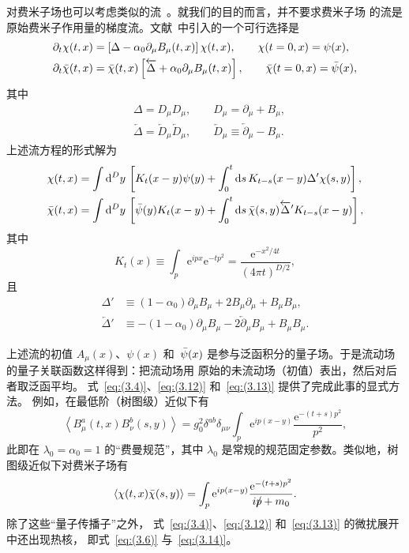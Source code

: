 对费米子场也可以考虑类似的流~\cite{Luscher:2013cpa}。就我们的目的而言，并不要求费米子场
的流是原始费米子作用量的梯度流。文献~\cite{Luscher:2013cpa}中引入的一个可行选择是
\begin{align}
   &\partial_t\chi(t,x)=\left[\Delta-\alpha_0\partial_\mu B_\mu(t,x)\right]
   \chi(t,x),\qquad
   \chi(t=0,x)=\psi(x),
\label{eq:(3.8)}\\
   &\partial_t\Bar{\chi}(t,x)
   =\Bar{\chi}(t,x)
   \left[\overleftarrow{\Delta}
   +\alpha_0\partial_\mu B_\mu(t,x)\right],
   \qquad\Bar{\chi}(t=0,x)=\Bar{\psi}(x),
\label{eq:(3.9)}
\end{align}
其中
\begin{align}
   &\Delta=D_\mu D_\mu,\qquad D_\mu=\partial_\mu+B_\mu,
\label{eq:(3.10)}\\
   &\overleftarrow{\Delta}=\overleftarrow{D}_\mu\overleftarrow{D}_\mu,
   \qquad\overleftarrow{D}_\mu\equiv\overleftarrow{\partial}_\mu-B_\mu.
\label{eq:(3.11)}
\end{align}
上述流方程的形式解为
\begin{align}
   \chi(t,x)&=\int\mathrm{d}^Dy\,
   \left[
   K_t(x-y)\psi(y)
   +\int_0^t\mathrm{d}s\,K_{t-s}(x-y)\Delta'\chi(s,y)
   \right],
\label{eq:(3.12)}\\
   \Bar{\chi}(t,x)&=\int\mathrm{d}^Dy\,
   \left[
   \Bar{\psi}(y)K_t(x-y)
   +\int_0^t\mathrm{d}s\,\Bar{\chi}(s,y)\overleftarrow{\Delta}'K_{t-s}(x-y)
   \right],
\label{eq:(3.13)}
\end{align}
其中
\begin{equation}
   K_t(x)\equiv\int_p \mathrm{e}^{ipx}\mathrm{e}^{-tp^2}=\frac{\mathrm{e}^{-x^2/4t}}{(4\pi t)^{D/2}},
\label{eq:(3.14)}
\end{equation}
且
\begin{align}
   \Delta'&\equiv(1-\alpha_0)\partial_\mu B_\mu
   +2B_\mu\partial_\mu+B_\mu B_\mu,
\label{eq:(3.15)}\\
   \overleftarrow{\Delta}'&
   \equiv-(1-\alpha_0)\partial_\mu B_\mu
   -2\overleftarrow{\partial}_\mu B_\mu+B_\mu B_\mu.
\label{eq:(3.16)}
\end{align}

上述流的初值 $A_\mu(x)$、$\psi(x)$
和~$\Bar{\psi}(x)$ 是参与泛函积分的量子场。于是流动场的量子关联函数这样得到：把流动场用
原始的未流动场（初值）表出，然后对后者取泛函平均。
式~\eqref{eq:(3.4)}、\eqref{eq:(3.12)} 和~\eqref{eq:(3.13)} 提供了完成此事的显式方法。
例如，在最低阶（树图级）近似下有
\begin{equation}
   \left\langle B_\mu^a(t,x)B_\nu^b(s,y)\right\rangle
   =g_0^2\delta^{ab}\delta_{\mu\nu}\int_p\mathrm{e}^{ip(x-y)}\frac{\mathrm{e}^{-(t+s)p^2}}{p^2},
\label{eq:(3.17)}
\end{equation}
此即在 $\lambda_0=\alpha_0=1$ 的“费曼规范”，其中 $\lambda_0$
是常规的规范固定参数。类似地，树图级近似下对费米子场有
\begin{equation}
   \left\langle\chi(t,x)\Bar{\chi}(s,y)\right\rangle
   =\int_p\mathrm{e}^{ip(x-y)}\frac{\mathrm{e}^{-(t+s)p^2}}{i\Slash{p}+m_0}.
\label{eq:(3.18)}
\end{equation}
除了这些“量子传播子”之外，
式~\eqref{eq:(3.4)}、\eqref{eq:(3.12)} 和~\eqref{eq:(3.13)} 的微扰展开中还出现热核，
即式~\eqref{eq:(3.6)} 与~\eqref{eq:(3.14)}。

